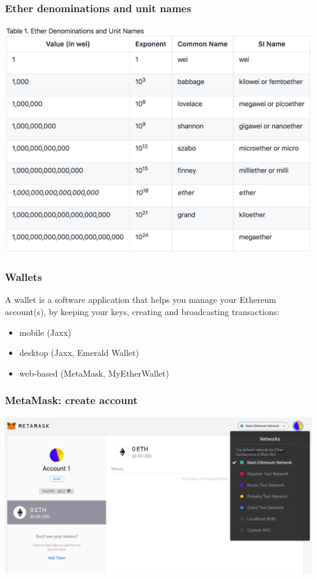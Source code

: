 \documentclass[11pt]{beamer}  %
\begin{document}
\begin{frame}\frametitle{Ether denominations and unit names}

  \begin{center}
    \includegraphics[scale=0.2,clip=false]{pictures/ether-denominations.png}
  \end{center}

\end{frame}

\begin{frame}\frametitle{Wallets}

  \begin{greenbox}{}
    A wallet is a
    software application that helps you manage your Ethereum account(s),
    by keeping your keys, creating and broadcasting transactions:
    \begin{itemize}
    \item mobile (Jaxx)
    \item desktop (Jaxx, Emerald Wallet)
    \item web-based (MetaMask, MyEtherWallet)
    \end{itemize}
  \end{greenbox}

\end{frame}

\begin{frame}\frametitle{MetaMask: create account}

  \begin{center}
    \includegraphics[width=\textwidth,clip=false]{pictures/metamask-account.png}
  \end{center}

\end{frame}
\end{document}
